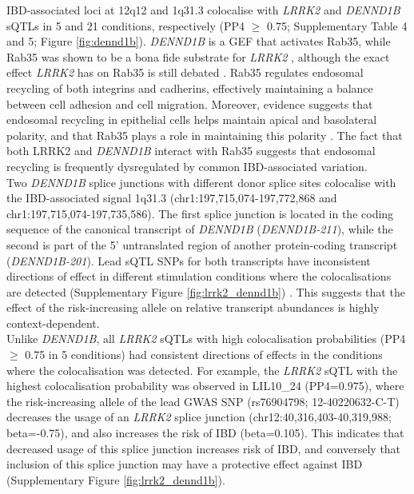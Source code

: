 IBD-associated loci at 12q12 and 1q31.3 colocalise with \textit{LRRK2} and \textit{DENND1B} sQTLs in 5 and 21 conditions, respectively (PP4 $\geq$ 0.75; Supplementary Table 4 and 5; Figure \ref{fig:dennd1b}). \textit{DENND1B} is a GEF that activates Rab35, while Rab35 was shown to be a bona fide substrate for \textit{LRRK2} \cite{Steger2016-yl,Bae2018-pu}, although the exact effect \textit{LRRK2} has on Rab35 is still debated \cite{Bae2018-pu,Bonet-Ponce2020-ri,Lee2021-ff}. Rab35 regulates endosomal recycling of both integrins and cadherins, effectively maintaining a balance between cell adhesion and cell migration. Moreover, evidence suggests that endosomal recycling in epithelial cells helps maintain apical and basolateral polarity, and that Rab35 plays a role in maintaining this polarity \cite{Mrozowska2016-lm,Kinoshita2020-yl}. The fact that both LRRK2 and \textit{DENND1B} interact with Rab35 suggests that endosomal recycling is frequently dysregulated by common IBD-associated variation. \\

Two \textit{DENND1B} splice junctions with different donor splice sites colocalise with the IBD-associated signal 1q31.3 (chr1:197,715,074-197,772,868 and chr1:197,715,074-197,735,586). The first splice junction is located in the coding sequence of the canonical transcript of \textit{DENND1B} (\textit{DENND1B-211}), while the second is part of the 5' untranslated region of another protein-coding transcript (\textit{DENND1B-201}). Lead sQTL SNPs for both transcripts have inconsistent directions of effect in different stimulation conditions where the colocalisations are detected (Supplementary Figure \ref{fig:lrrk2_dennd1b}) . This suggests that the effect of the risk-increasing allele on relative transcript abundances is highly context-dependent. \\

Unlike \textit{DENND1B}, all \textit{LRRK2} sQTLs with high colocalisation probabilities (PP4 $\geq$ 0.75 in 5 conditions) had consistent directions of effects in the conditions where the colocalisation was detected. For example, the \textit{LRRK2} sQTL with the highest colocalisation probability was observed in LIL10\_24 (PP4=0.975), where the risk-increasing allele of the lead GWAS SNP (rs76904798; 12-40220632-C-T) decreases the usage of an \textit{LRRK2} splice junction (chr12:40,316,403-40,319,988; beta=-0.75), and also increases the risk of IBD (beta=0.105). This indicates that decreased usage of this splice junction increases risk of IBD, and conversely that inclusion of this splice junction may have a protective effect against IBD (Supplementary Figure \ref{fig:lrrk2_dennd1b}). \\

